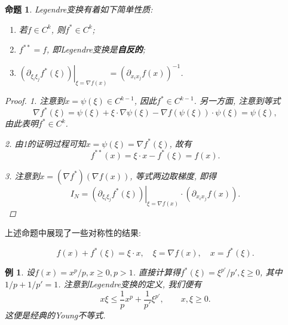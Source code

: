 \documentclass[12pt,a4paper]{article}
\newtheorem{proposition}[theorem]{命题}
\newtheorem{example}[theorem]{例}
\begin{document}
\begin{proposition}
    Legendre变换有着如下简单性质:
    \begin{enumerate}
        \item 若$f \in C^k$, 则$f^* \in C^k$;
        \item $f^{**} = f$, 即Legendre变换是\textbf{自反的};
        \item $\left.(\partial_{\xi_i\xi_j}f^*(\xi))\right|_{\xi = \nabla f(x)} = (\partial_{x_ix_j}f(x))^{-1}$.
    \end{enumerate}
    \begin{proof}
        1. 注意到$x = \psi(\xi) \in C^{k - 1}$, 因此$f^* \in C^{k - 1}$. 另一方面, 注意到等式 
        \begin{equation*}
            \nabla f^*(\xi) = \psi(\xi) + \xi \cdot \nabla\psi(\xi) - \nabla f(\psi(\xi)) \cdot \psi(\xi) = \psi(\xi),
        \end{equation*}
        由此表明$f^* \in C^k$.

        2. 由1的证明过程可知$x = \psi(\xi) = \nabla f^*(\xi)$, 故有 
        \begin{equation*}
            f^{**}(x) = \xi \cdot x - f^*(\xi) = f(x).
        \end{equation*}

        3. 注意到$x = (\nabla f^*)(\nabla f(x))$, 等式两边取梯度, 即得 
        \begin{equation*}
            I_N = \left.(\partial_{\xi_i\xi_j}f^*(\xi))\right|_{\xi = \nabla f(x)} \cdot (\partial_{x_ix_j}f(x)).
        \end{equation*}
    \end{proof}
\end{proposition}

上述命题中展现了一些对称性的结果:

\begin{equation*}
    \boxed{f(x) + f^*(\xi) = \xi \cdot x, \quad \xi = \nabla f(x), \quad x = f^*(\xi).}
\end{equation*}

\begin{example}
    设$f(x) = x^p/p, x \geq 0, p > 1$. 直接计算得$f^*(\xi) = \xi^{p'}/p', \xi \geq 0$, 其中$1/p + 1/p' = 1$.
    注意到Legendre变换的定义, 我们便有 
    \begin{equation*}
        x\xi \leq \frac{1}{p}x^p + \frac{1}{p'}\xi^{p'}, \qquad x, \xi \geq 0.
    \end{equation*}
    这便是经典的Young不等式.
\end{example}
\end{document}
